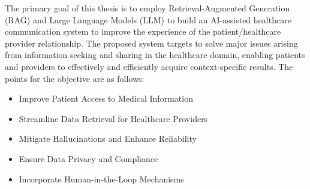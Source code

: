 The primary goal of this thesis is to employ Retrieval-Augmented Generation (RAG) and Large Language Models (LLM) to build an AI-assisted healthcare communication system to improve the experience of the patient/healthcare provider relationship. The proposed system targets to solve major issues arising from information seeking and sharing in the healthcare domain, enabling patients and providers to effectively and efficiently acquire context-specific results. The points for the objective are as follows:

\begin{itemize}
    \item Improve Patient Access to Medical Information
    \item Streamline Data Retrieval for Healthcare Providers
    \item Mitigate Hallucinations and Enhance Reliability
    \item Ensure Data Privacy and Compliance
    \item Incorporate Human-in-the-Loop Mechanisms
\end{itemize}